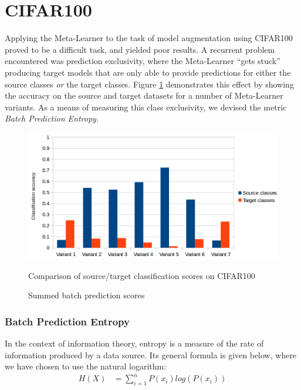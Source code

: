 \documentclass{report}
\begin{document}
\section{CIFAR100}
Applying the Meta-Learner to the task of model augmentation using CIFAR100 proved to be a difficult task, and yielded poor results. A recurrent problem encountered was prediction exclusivity, where the Meta-Learner ``gets stuck'' producing target models that are only able to provide predictions for either the source classes \textit{or} the target classes. Figure \ref{fig:cifaraccuracy:1} demonstrates this effect by showing the accuracy on the source and target datasets for a number of Meta-Learner variants. As a means of measuring this class exclusivity, we devised the metric \textit{Batch Prediction Entropy}. \par
\begin{figure}[!h!]
	\centering
	\includegraphics[width=13cm]{cifaraccuracy}
	\caption{Summed batch prediction scores}
	Comparison of source/target classification scores on CIFAR100
	\label{fig:cifaraccuracy:1}
\end{figure}

\subsubsection{Batch Prediction Entropy}
In the context of information theory, entropy is a measure of the rate of information produced by a data source. Its general formula is given below, where we have chosen to use the natural logarithm:
\begin{align}
H(X) &= \sum_{i=1}^{n}P(x_i) log(P(x_i)) \label{entropyfunc}
\end{align}
\end{document}
